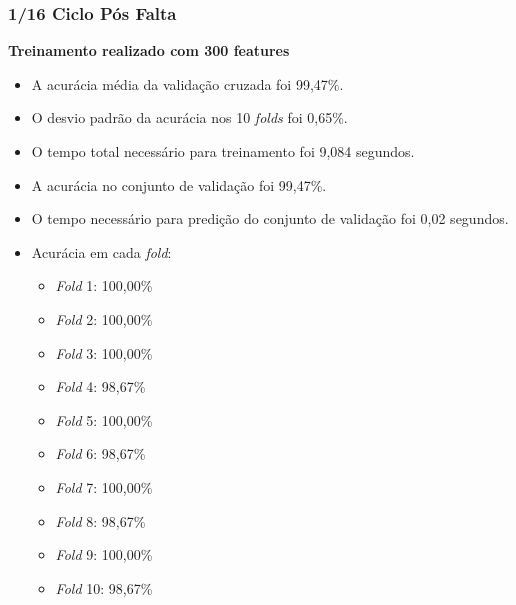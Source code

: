 \subsubsection{1/16 Ciclo Pós Falta}
\textbf{Treinamento realizado com 300 features}
\begin{itemize}
    \item A acurácia média da validação cruzada foi 99,47\%.
    \item O desvio padrão da acurácia nos 10 \textit{folds} foi 0,65\%.
    \item O tempo total necessário para treinamento foi 9,084 segundos.
    \item A acurácia no conjunto de validação foi 99,47\%.
    \item O tempo necessário para predição do conjunto de validação foi 0,02 segundos.
    \item Acurácia em cada \textit{fold}:
    \begin{itemize}
        \item \textit{Fold} 1: 100,00\%
        \item \textit{Fold} 2: 100,00\%
        \item \textit{Fold} 3: 100,00\%
        \item \textit{Fold} 4: 98,67\%
        \item \textit{Fold} 5: 100,00\%
        \item \textit{Fold} 6: 98,67\%
        \item \textit{Fold} 7: 100,00\%
        \item \textit{Fold} 8: 98,67\%
        \item \textit{Fold} 9: 100,00\%
        \item \textit{Fold} 10: 98,67\%
    \end{itemize}
\end{itemize}

